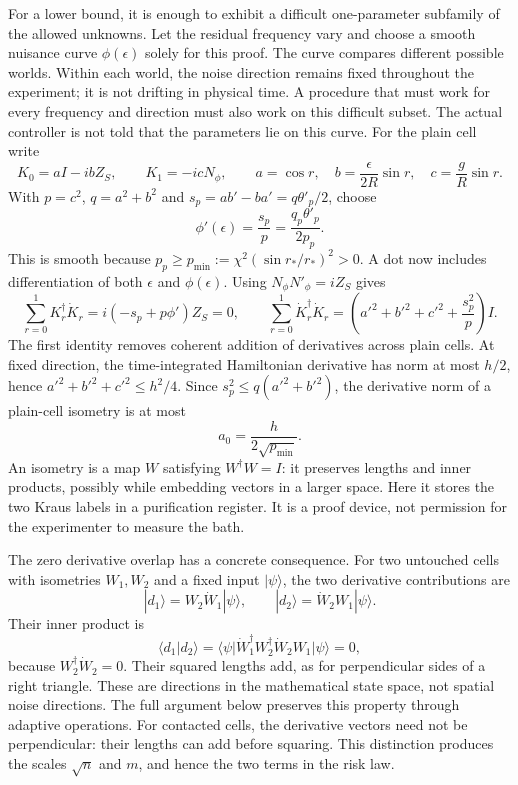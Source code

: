 \documentclass[11pt,a4paper]{article}
\numberwithin{equation}{section}
\theoremstyle{remark}
\begin{document}
For a lower bound, it is enough to exhibit a difficult one-parameter
subfamily of the allowed unknowns. Let the residual frequency vary and
choose a smooth nuisance curve $\phi(\epsilon)$ solely for this proof.
The curve compares different possible worlds. Within each world, the
noise direction remains fixed throughout the experiment; it is not
drifting in physical time. A procedure that must work for every frequency
and direction must also work on this difficult subset.
The actual controller is not told that the parameters lie on this curve.
For the plain cell write
\begin{equation}
 K_0=aI-ibZ_S,\qquad K_1=-icN_\phi,\qquad
 a=\cos r,\quad b=\frac\epsilon{2R}\sin r,\quad
 c=\frac gR\sin r.
\end{equation}
With $p=c^2$, $q=a^2+b^2$ and $s_p=ab'-ba'=q\theta'_p/2$, choose
\begin{equation}
 \phi'(\epsilon)=\frac{s_p}{p}
                =\frac{q_p\theta'_p}{2p_p}.
 \label{con:nuisance}
\end{equation}
This is smooth because
$p_p\ge p_{\min}:=\chi^2(\sin r_*/r_*)^2>0$.
A dot now includes differentiation of both $\epsilon$ and $\phi(\epsilon)$.
Using $N_\phi N'_\phi=iZ_S$ gives
\begin{equation}
 \sum_{r=0}^1K_r^\dagger\dot K_r
   =i(-s_p+p\phi')Z_S=0,\qquad
 \sum_{r=0}^1\dot K_r^\dagger\dot K_r
   =\left(a'^2+b'^2+c'^2+\frac{s_p^2}{p}\right)I.
\end{equation}
The first identity removes coherent addition of derivatives across plain
cells. At fixed direction, the time-integrated Hamiltonian derivative has
norm at most $h/2$, hence $a'^2+b'^2+c'^2\le h^2/4$.
Since $s_p^2\le q(a'^2+b'^2)$, the derivative norm of a plain-cell
isometry is at most
\begin{equation}
 a_0=\frac{h}{2\sqrt{p_{\min}}}.
\end{equation}
An isometry is a map $W$ satisfying $W^\dagger W=I$: it preserves
lengths and inner products, possibly while embedding vectors in a larger
space. Here it stores the two Kraus labels in a purification register.
It is a proof device, not permission for the experimenter to measure the bath.

The zero derivative overlap has a concrete consequence. For two untouched
cells with isometries $W_1,W_2$ and a fixed input $|\psi\rangle$,
the two derivative contributions are
\begin{equation}
 |d_1\rangle=W_2\dot W_1|\psi\rangle,\qquad
 |d_2\rangle=\dot W_2W_1|\psi\rangle.
\end{equation}
Their inner product is
\begin{equation}
 \langle d_1|d_2\rangle
 =\langle\psi|\dot W_1^\dagger W_2^\dagger\dot W_2W_1|\psi\rangle=0,
\end{equation}
because $W_2^\dagger\dot W_2=0$. Their squared lengths add, as for
perpendicular sides of a right triangle. These are directions in the
mathematical state space, not spatial noise directions. The full argument
below preserves this property through adaptive operations. For contacted
cells, the derivative vectors need not be perpendicular: their lengths
can add before squaring. This distinction produces the scales $\sqrt n$
and $m$, and hence the two terms in the risk law.
\end{document}
